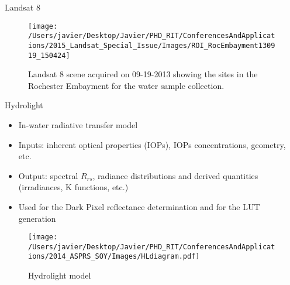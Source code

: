 \documentclass{beamer}
\begin{document}
\begin{frame}{}
\begin{columns}[t]
\begin{column}{.32\linewidth}
\begin{block}{Landsat 8}
\begin{figure}[htb]
  \centering
  \texttt{[image: /Users/javier/Desktop/Javier/PHD\_RIT/ConferencesAndApplications/2015\_Landsat\_Special\_Issue/Images/ROI\_RocEmbayment130919\_150424]}
  \caption{Landsat 8 scene acquired on 09-19-2013 showing the sites in the Rochester Embayment for the water sample collection. \label{fig:091913Sites} } 
\end{figure}

\vspace{-.5cm}
\end{block}
\begin{block}{Hydrolight}
\small
\begin{itemize}
  \item In-water radiative transfer model
  \vspace{0.5cm}
  \item Inputs: inherent optical properties (IOPs), IOPs concentrations, geometry, etc.
  \vspace{0.5cm}
  \item Output: spectral $R_{rs}$, radiance distributions and derived quantities (irradiances, K functions, etc.)
  \vspace{0.5cm}
  \item Used for the Dark Pixel reflectance determination and for the LUT generation
\end{itemize}
\vspace{1cm}
\begin{figure}[H]
    \texttt{[image: /Users/javier/Desktop/Javier/PHD\_RIT/ConferencesAndApplications/2014\_ASPRS\_SOY/Images/HLdiagram.pdf]}
    \caption{Hydrolight model}
\end{figure}
\end{block}

\end{column}   


\end{columns}
\end{frame}
\end{document}
